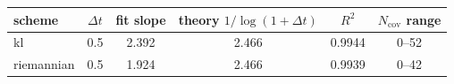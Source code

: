 \begin{tabular}{lccccc}
\toprule
scheme & $\Delta t$ & fit slope & theory $1/\log(1+\Delta t)$ & $R^2$ & $N_{\mathrm{cov}}$ range \\
\midrule
kl & 0.5 & 2.392 & 2.466 & 0.9944 & 0--52 \\
riemannian & 0.5 & 1.924 & 2.466 & 0.9939 & 0--42 \\
\bottomrule
\end{tabular}

